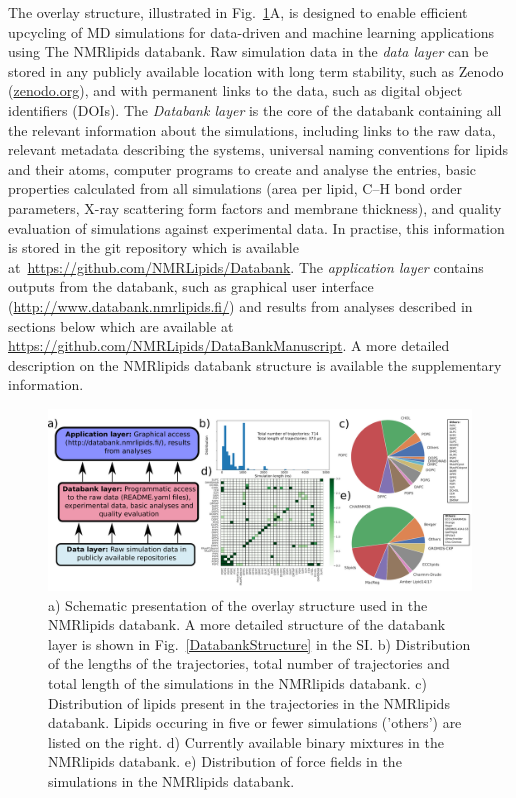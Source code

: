 \documentclass[fleqn,10pt]{wlscirep}
\begin{document}
The overlay structure, illustrated in Fig.~\ref{fig:overlay}A, is designed to enable efficient upcycling of MD simulations for data-driven and machine learning applications using 
The NMRlipids databank. Raw simulation data in the {\it data layer} can be stored in any publicly available location with long term stability, such as Zenodo (\url{zenodo.org}), and with permanent links to the data, such as digital object identifiers (DOIs). 
The {\it Databank layer} is the core of the databank containing all the relevant information about the simulations, including links to the raw data, relevant metadata describing the systems, universal naming conventions for lipids and their atoms, computer programs to create and analyse the entries, basic properties calculated from all simulations (area per lipid, C--H bond order parameters, X-ray scattering form factors and membrane thickness), and quality evaluation of simulations against experimental data. In practise, this information is stored in the git repository which is available at~\url{https://github.com/NMRLipids/Databank}. The {\it application layer} contains outputs from the databank, such as graphical user interface (\url{http://www.databank.nmrlipids.fi/}) and results from analyses described in sections below which are available at \url{https://github.com/NMRLipids/DataBankManuscript}. A more detailed description on the NMRlipids databank structure is available the supplementary information. 



\begin{figure}
    \centering
    \includegraphics[width=\linewidth]{Figures/overlay2.pdf}
    \caption{a) Schematic presentation of the overlay structure used in the NMRlipids databank. A more detailed structure of the databank layer is shown in Fig.~\ref{DatabankStructure} in the SI.
    b) Distribution of the lengths of the trajectories, total number of trajectories and total length of the simulations in the NMRlipids databank.
    c) Distribution of lipids present in the trajectories in the NMRlipids databank. Lipids occuring in five or fewer simulations ('others') are listed on the right. 
    d) Currently available binary mixtures in the NMRlipids databank. 
    e) Distribution of force fields in the simulations in the NMRlipids databank.
    }
    \label{fig:overlay}
\end{figure}
\end{document}
